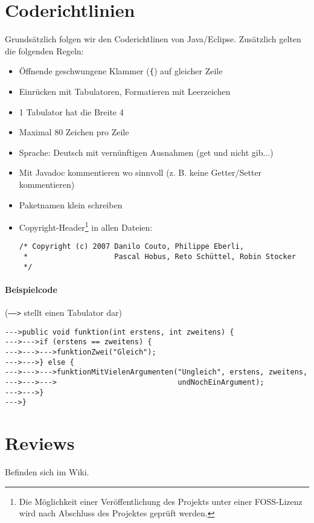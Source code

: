 \documentclass[12pt,halfparskip]{scrartcl}
\begin{document}


\section{Coderichtlinien}\label{sub:coderichtlinien} %

Grundsätzlich folgen wir den Coderichtlinen von Java/Eclipse. Zusätzlich gelten die folgenden Regeln:

\begin{itemize}
  \item Öffnende geschwungene Klammer (\texttt{\{}) auf gleicher Zeile
  \item Einrücken mit Tabulatoren, Formatieren mit Leerzeichen
  \item 1 Tabulator hat die Breite 4
  \item Maximal 80 Zeichen pro Zeile
  \item Sprache: Deutsch mit vernünftigen Ausnahmen (get und nicht gib...)
  \item Mit Javadoc kommentieren wo sinnvoll (z. B. keine Getter/Setter kommentieren)
  \item Paketnamen klein schreiben
  \item Copyright-Header\footnote{Die Möglichkeit einer Veröffentlichung des Projekts unter einer FOSS-Lizenz wird nach Abschluss des Projektes geprüft werden.} in allen Dateien:
    \begin{verbatim}
/* Copyright (c) 2007 Danilo Couto, Philippe Eberli,
 *                    Pascal Hobus, Reto Schüttel, Robin Stocker
 */
    \end{verbatim}
\end{itemize}


\paragraph{Beispielcode} (\texttt{----->} stellt einen Tabulator dar)

\begin{verbatim}
--->public void funktion(int erstens, int zweitens) {
--->--->if (erstens == zweitens) {
--->--->--->funktionZwei("Gleich");
--->--->} else {
--->--->--->funktionMitVielenArgumenten("Ungleich", erstens, zweitens,
--->--->--->                            undNochEinArgument);
--->--->}
--->}
\end{verbatim}

\section{Reviews} %
\label{sec:reviews}
Befinden sich im Wiki.

\end{document}
